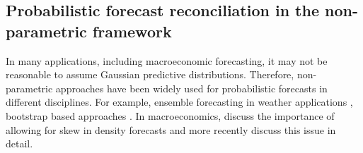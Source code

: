 \documentclass[graybox]{svmult}
\begin{document}
\subsection{Probabilistic forecast reconciliation in the non-parametric framework}\label{sec:probrecnp}

In many applications, including macroeconomic forecasting, it may not be reasonable to assume Gaussian predictive distributions. Therefore, non-parametric approaches have been widely used for probabilistic forecasts in different disciplines. For example, ensemble forecasting in weather applications \citep{GneRaf2005,Gneiting2014,Gneiting2008}, bootstrap based approaches \citep{Manzan2008,Vilar2013}. In macroeconomics, \cite{CogEtAl2005} discuss the importance of allowing for skew in density forecasts and more recently \cite{SmiVah2016} discuss this issue in detail.


\end{document}
